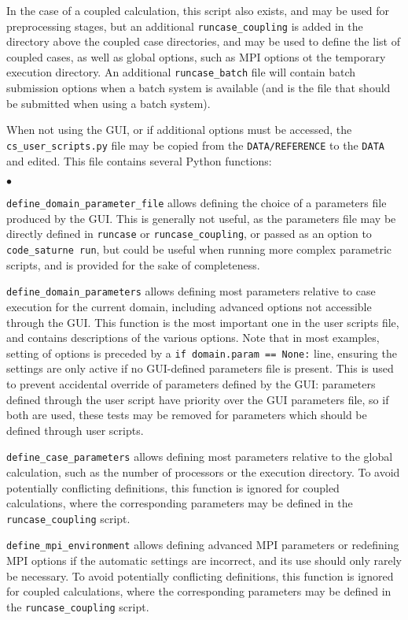 {{{In the case of a coupled calculation, this script also exists, and
may be used for preprocessing stages, but an additional
\texttt{runcase\_coupling} is added in the directory above the coupled case
directories, and may be used to define the list of coupled cases,
as well as global options, such as MPI options ot the temporary
execution directory. An additional \texttt{runcase\_batch} file will
contain batch submission options when a batch system is available
(and is the file that should be submitted when using a batch system).

When not using the GUI, or if additional options must be accessed,
the \texttt{cs\_user\_scripts.py} file may be copied from
the \texttt{DATA/REFERENCE} to the \texttt{DATA} and edited.
This file contains several Python functions:

\begin{list}{$\bullet$}{}

\item \texttt{define\_domain\_parameter\_file} allows defining
 the choice of a parameters file produced by the GUI. This is
 generally not useful, as the parameters file may be directly
 defined in \texttt{runcase} or \texttt{runcase\_coupling}, or passed
 as an option to \texttt{code\_saturne run}, but could be useful
 when running more complex parametric scripts, and is provided for
 the sake of completeness.
\item \texttt{define\_domain\_parameters} allows defining
 most parameters relative to case execution for the current
 domain, including advanced options not accessible
 through the GUI. This function is the most important one in the user
 scripts file, and contains descriptions of the various options.
 Note that in most examples, setting of options is preceded by
 a \texttt{if domain.param == None:} line, ensuring the settings
 are only active if no GUI-defined parameters file is present.
 This is used to prevent accidental override of parameters defined
 by the GUI: parameters defined through the user script have priority
 over the GUI parameters file, so if both are used, these tests
 may be removed for parameters which should be defined through
 user scripts.
\item \texttt{define\_case\_parameters} allows defining
 most parameters relative to the global calculation, such as
 the number of processors or the execution directory.
 To avoid potentially conflicting definitions, this function is ignored
 for coupled calculations, where the corresponding parameters
 may be defined in the \texttt{runcase\_coupling} script.
\item \texttt{define\_mpi\_environment} allows defining
 advanced MPI parameters or redefining MPI options if the automatic
 settings are incorrect, and its use should only rarely be necessary.
 To avoid potentially conflicting definitions, this function is ignored
 for coupled calculations, where the corresponding parameters
 may be defined in the \texttt{runcase\_coupling} script.
\end{list}

}}}
